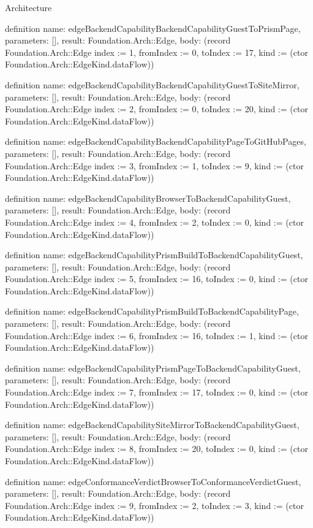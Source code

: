 \begin{lexlean}{Architecture}
\begin{semanticmodule}
definition{
  name: edgeBackendCapabilityBackendCapabilityGuestToPrismPage,
  parameters: [],
  result: Foundation.Arch::Edge,
  body: (record Foundation.Arch::Edge {index := 1, fromIndex := 0, toIndex := 17, kind := (ctor Foundation.Arch::EdgeKind.dataFlow)})
}

definition{
  name: edgeBackendCapabilityBackendCapabilityGuestToSiteMirror,
  parameters: [],
  result: Foundation.Arch::Edge,
  body: (record Foundation.Arch::Edge {index := 2, fromIndex := 0, toIndex := 20, kind := (ctor Foundation.Arch::EdgeKind.dataFlow)})
}

definition{
  name: edgeBackendCapabilityBackendCapabilityPageToGitHubPages,
  parameters: [],
  result: Foundation.Arch::Edge,
  body: (record Foundation.Arch::Edge {index := 3, fromIndex := 1, toIndex := 9, kind := (ctor Foundation.Arch::EdgeKind.dataFlow)})
}

definition{
  name: edgeBackendCapabilityBrowserToBackendCapabilityGuest,
  parameters: [],
  result: Foundation.Arch::Edge,
  body: (record Foundation.Arch::Edge {index := 4, fromIndex := 2, toIndex := 0, kind := (ctor Foundation.Arch::EdgeKind.dataFlow)})
}

definition{
  name: edgeBackendCapabilityPrismBuildToBackendCapabilityGuest,
  parameters: [],
  result: Foundation.Arch::Edge,
  body: (record Foundation.Arch::Edge {index := 5, fromIndex := 16, toIndex := 0, kind := (ctor Foundation.Arch::EdgeKind.dataFlow)})
}

definition{
  name: edgeBackendCapabilityPrismBuildToBackendCapabilityPage,
  parameters: [],
  result: Foundation.Arch::Edge,
  body: (record Foundation.Arch::Edge {index := 6, fromIndex := 16, toIndex := 1, kind := (ctor Foundation.Arch::EdgeKind.dataFlow)})
}

definition{
  name: edgeBackendCapabilityPrismPageToBackendCapabilityGuest,
  parameters: [],
  result: Foundation.Arch::Edge,
  body: (record Foundation.Arch::Edge {index := 7, fromIndex := 17, toIndex := 0, kind := (ctor Foundation.Arch::EdgeKind.dataFlow)})
}

definition{
  name: edgeBackendCapabilitySiteMirrorToBackendCapabilityGuest,
  parameters: [],
  result: Foundation.Arch::Edge,
  body: (record Foundation.Arch::Edge {index := 8, fromIndex := 20, toIndex := 0, kind := (ctor Foundation.Arch::EdgeKind.dataFlow)})
}

definition{
  name: edgeConformanceVerdictBrowserToConformanceVerdictGuest,
  parameters: [],
  result: Foundation.Arch::Edge,
  body: (record Foundation.Arch::Edge {index := 9, fromIndex := 2, toIndex := 3, kind := (ctor Foundation.Arch::EdgeKind.dataFlow)})
}


\end{semanticmodule}
\end{lexlean}
